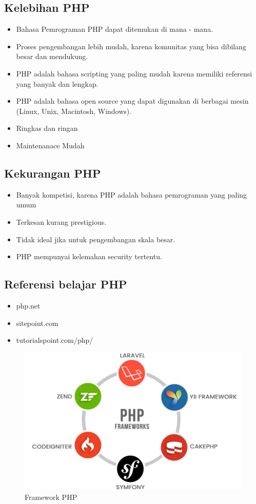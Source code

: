 \subsection{Kelebihan PHP}
\begin{itemize}
	\item Bahasa Pemrograman PHP dapat ditemukan di mana - mana.
	\item Proses pengembangan lebih mudah, karena komunitas yang bisa dibilang besar dan mendukung.
	\item PHP adalah bahasa scripting yang paling mudah karena memiliki referensi yang banyak dan lengkap.
	\item PHP adalah bahasa open source yang dapat digunakan di berbagai mesin (Linux, Unix, Macintosh, Windows).
	\item Ringkas dan ringan
	\item Maintenanace Mudah
\end{itemize}
\subsection{Kekurangan PHP}
\begin{itemize}
	\item Banyak kompetisi, karena PHP adalah bahasa pemrograman yang paling umum
	\item Terkesan kurang prestigious.
	\item Tidak ideal jika untuk pengembangan skala besar.
	\item PHP mempunyai kelemahan security tertentu.
\end{itemize}

\subsection{Referensi belajar PHP}
\begin{itemize}
	\item php.net
	\item sitepoint.com
	\item tutorialspoint.com/php/
\end{itemize}

	\begin{figure}[H]
		\includegraphics[width=12cm]{figures/web/phpframework.png}
		\centering
		\caption{Framework PHP}
	\end{figure}
